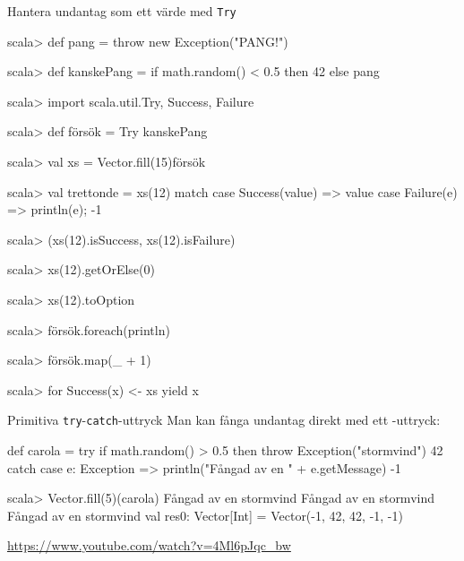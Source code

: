 \begin{Slide}{Hantera undantag som ett värde med \texttt{Try}}
\vspace{-0.5em}\begin{REPLsmall}
scala> def pang = throw new Exception("PANG!")

scala> def kanskePang = if math.random() < 0.5 then 42 else pang

scala> import scala.util.{Try, Success, Failure}

scala> def försök = Try { kanskePang }

scala> val xs = Vector.fill(15){försök}

scala> val trettonde = xs(12) match
         case Success(value) => value
         case Failure(e) => println(e); -1

scala> (xs(12).isSuccess, xs(12).isFailure) 

scala> xs(12).getOrElse(0)

scala> xs(12).toOption

scala> försök.foreach(println)

scala> försök.map(_ + 1)

scala> for Success(x) <- xs yield x
\end{REPLsmall}
\end{Slide}



\begin{Slide}{Primitiva \texttt{try}-\texttt{catch}-uttryck}\SlideFontSmall
Man kan fånga undantag direkt med ett -uttryck:
\begin{Code}
def carola = 
  try 
    if math.random() > 0.5 then throw Exception("stormvind")
    42
  catch 
    case e: Exception =>
      println("Fångad av en " + e.getMessage)
      -1

\end{Code}
\pause
\begin{REPL}
scala> Vector.fill(5)(carola)
Fångad av en stormvind
Fångad av en stormvind
Fångad av en stormvind
val res0: Vector[Int] = Vector(-1, 42, 42, -1, -1)
\end{REPL}
\url{https://www.youtube.com/watch?v=4Ml6pJqc_bw}
\end{Slide}


